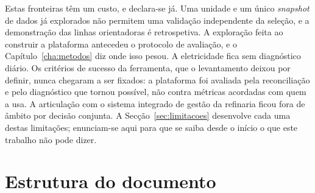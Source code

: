 Estas fronteiras têm um custo, e declara-se já. Uma unidade e um único
\emph{snapshot} de dados já explorados não permitem uma validação
independente da seleção, e a demonstração das linhas orientadoras é
retrospetiva. A exploração feita ao construir a plataforma
antecedeu o protocolo de avaliação, e o Capítulo~\ref{cha:metodos} diz
onde isso pesou. A
eletricidade fica sem diagnóstico diário. Os
critérios de sucesso da ferramenta, que o levantamento deixou por
definir, nunca chegaram a ser fixados: a plataforma foi avaliada pela
reconciliação e pelo diagnóstico que tornou possível, não contra
métricas acordadas com quem a usa. A articulação com o sistema integrado
de gestão da refinaria ficou fora de âmbito por decisão conjunta. A
Secção~\ref{sec:limitacoes} desenvolve cada uma destas limitações;
enunciam-se aqui para que se saiba desde o início o que este trabalho
não pode dizer.

\section{Estrutura do documento}
\label{sec:estrutura}



